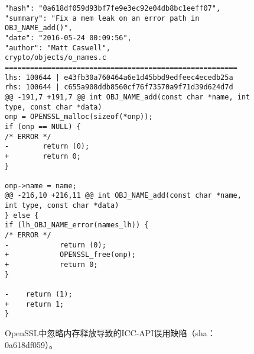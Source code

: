 \begin{figure}[t]
	\centering
\begin{lstlisting}
"hash": "0a618df059d93bf7fe9e3ec92e04db8bc1eeff07",
"summary": "Fix a mem leak on an error path in OBJ_NAME_add()",
"date": "2016-05-24 00:09:56",
"author": "Matt Caswell",
crypto/objects/o_names.c
=======================================================
lhs: 100644 | e43fb30a760464a6e1d45bbd9edfeec4ecedb25a
rhs: 100644 | c655a908ddb8560cf76f73570a9f71d39d624d7d
@@ -191,7 +191,7 @@ int OBJ_NAME_add(const char *name, int type, const char *data)
onp = OPENSSL_malloc(sizeof(*onp));
if (onp == NULL) {
/* ERROR */
-        return (0);
+        return 0;
}

onp->name = name;
@@ -216,10 +216,11 @@ int OBJ_NAME_add(const char *name, int type, const char *data)
} else {
if (lh_OBJ_NAME_error(names_lh)) {
/* ERROR */
-            return (0);
+            OPENSSL_free(onp);
+            return 0;
}

-    return (1);
+    return 1;
}

\end{lstlisting}
	\caption{
	OpenSSL中忽略内存释放导致的ICC-API误用缺陷（sha：0a618df059）。
	}
	\label{fig:2-3-icc-1}
\end{figure}